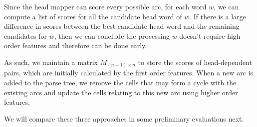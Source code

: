 Since the head mapper can score every possible arc,
for each word $w$, we can compute a list of scores for all the candidate
head word of $w$. If there is a large difference in scores between the best
candidate head word and the remaining candidates for $w$, 
then we can conclude the processing $w$ doesn't require high order features
and therefore can be done early.

As such, we maintain a matrix $M_{(n+1) \times n}$ to store the scores of 
head-dependent pairs, which are initially calculated by the first order 
features. When a new arc is added to the parse tree, we remove the 
cells that may form a cycle with the existing arcs and update the cells 
relating to this new arc using higher order features.

We will compare these three approaches in some preliminary evaluations next.




